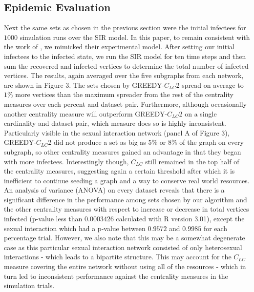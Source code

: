 \subsection*{Epidemic Evaluation} 
Next the same sets as chosen in the previous section were the initial infectees for $1000$ simulation runs over the SIR model.  In this paper, to remain consistent with the work of \cite{chen12}, we mimicked their experimental model.  After setting our initial infectees to the infected state, we run the SIR model for ten time steps and then sum the recovered and infected vertices to determine the total number of infected vertices.  The results, again averaged over the five subgraphs from each network, are shown in Figure 3. The sets chosen by GREEDY-$C_{LC}$2 spread on average to $1\%$ more vertices than the maximum spreader from the rest of the centrality measures over each percent and dataset pair.  Furthermore, although occasionally another centrality measure will outperform GREEDY-$C_{LC}$2 on a single cardinality and dataset pair, which measure does so is highly inconsistent.  Particularly visible in the sexual interaction network (panel A of Figure 3), GREEDY-$C_{LC}$2 did not produce a set as big as $5\%$ or $8\%$ of the graph on every subgraph, so other centrality measures gained an advantage in that they began with more infectees.  Interestingly though, $C_{LC}$ still remained in the top half of the centrality measures, suggesting again a certain threshold after which it is inefficient to continue seeding a graph and a way to conserve real world resources.  An analysis of variance (ANOVA) on every dataset reveals that there is a significant difference in the performance among sets chosen by our algorithm and the other centrality measures with respect to increase or decrease in total vertices infected (p-value less than $0.0003426$ calculated with R version 3.01), except the sexual interaction which had a p-value between $0.9572$ and $0.9985$ for each percentage trial.  However, we also note that this may be a somewhat degenerate case as this particular sexual interaction network consisted of only heterosexual interactions - which leads to a bipartite structure.  This may account for the $C_{LC}$ measure covering the entire network without using all of the resources - which in turn led to inconsistent performance against the centrality measures in the simulation trials.

